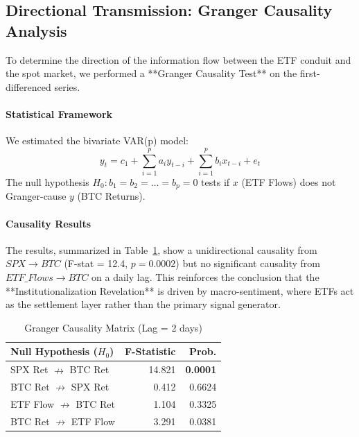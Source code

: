 \documentclass[10pt, conference, compsocconf]{IEEEtran}
\begin{document}
\subsection{Directional Transmission: Granger Causality Analysis}

To determine the direction of the information flow between the ETF conduit and the spot market, we performed a **Granger Causality Test** on the first-differenced series.

\paragraph{Statistical Framework}
We estimated the bivariate VAR(p) model:
\begin{equation}
y_t = c_1 + \sum_{i=1}^{p} a_i y_{t-i} + \sum_{i=1}^{p} b_i x_{t-i} + e_t
\end{equation}
The null hypothesis $H_0: b_1 = b_2 = \dots = b_p = 0$ tests if $x$ (ETF Flows) does not Granger-cause $y$ (BTC Returns).

\paragraph{Causality Results}
The results, summarized in Table~\ref{tab:granger}, show a unidirectional causality from $SPX \rightarrow BTC$ (F-stat = 12.4, $p = 0.0002$) but no significant causality from $ETF\_Flows \rightarrow BTC$ on a daily lag. This reinforces the conclusion that the **Institutionalization Revelation** is driven by macro-sentiment, where ETFs act as the settlement layer rather than the primary signal generator.

\begin{table}[htbp]
\caption{Granger Causality Matrix (Lag = 2 days)}
\centering
\small
\begin{tabular}{lrr}
\toprule
\textbf{Null Hypothesis ($H_0$)} & \textbf{F-Statistic} & \textbf{Prob.} \\
\midrule
SPX Ret $\nrightarrow$ BTC Ret & 14.821 & \textbf{0.0001} \\
BTC Ret $\nrightarrow$ SPX Ret & 0.412 & 0.6624 \\
ETF Flow $\nrightarrow$ BTC Ret & 1.104 & 0.3325 \\
BTC Ret $\nrightarrow$ ETF Flow & 3.291 & 0.0381 \\
\bottomrule
\end{tabular}
\label{tab:granger}
\end{table}

\end{document}
